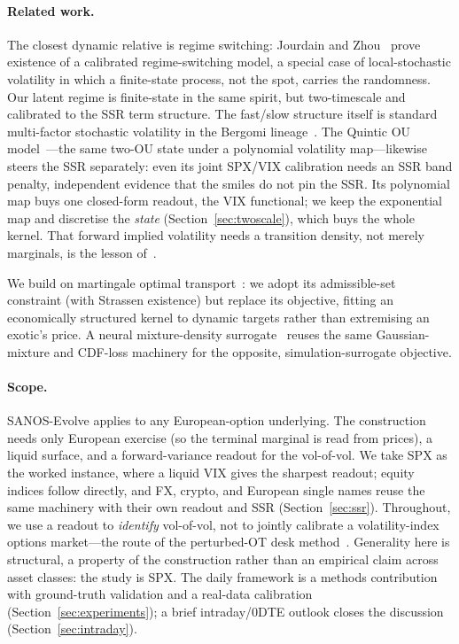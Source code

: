 \documentclass[11pt]{article}
\begin{document}
\paragraph{Related work.}
The closest dynamic relative is regime switching: Jourdain and Zhou~\cite{jourdain2020} prove existence of a calibrated
regime-switching model, a special case of local-stochastic volatility in which a finite-state process,
not the spot, carries the randomness. Our latent regime is finite-state in the same spirit, but
two-timescale and calibrated to the SSR term structure. The fast/slow structure itself is standard
multi-factor stochastic volatility in the Bergomi lineage~\cite{bergomi2009}. The Quintic OU
model~\cite{abijaber2025}---the same two-OU state under a polynomial volatility map---likewise steers
the SSR separately: even its joint SPX/VIX calibration needs an SSR band penalty, independent evidence
that the smiles do not pin the SSR. Its polynomial map buys one closed-form readout, the VIX functional;
we keep the exponential map and discretise the \emph{state} (Section~\ref{sec:twoscale}), which buys the
whole kernel. That forward implied volatility needs a transition density, not merely marginals, is the
lesson of~\cite{glasserman2010forward}.

We build on martingale optimal transport~\cite{strassen1965,beiglbock2013}: we adopt its admissible-set
constraint (with Strassen existence) but replace its objective, fitting an economically structured
kernel to dynamic targets rather than extremising an exotic's price. A neural mixture-density
surrogate~\cite{vandenberg2026} reuses the same Gaussian-mixture and CDF-loss machinery for the
opposite, simulation-surrogate objective.

\paragraph{Scope.}
SANOS-Evolve applies to any European-option underlying. The construction needs only European exercise
(so the terminal marginal is read from prices), a liquid surface, and a forward-variance readout for the
vol-of-vol. We take SPX as the worked instance, where a liquid VIX gives the sharpest readout; equity
indices follow directly, and FX, crypto, and European single names reuse the same machinery with their
own readout and SSR (Section~\ref{sec:ssr}). Throughout, we use a readout to \emph{identify} vol-of-vol,
not to jointly calibrate a volatility-index options market---the route of the perturbed-OT desk
method~\cite{che2026pot}. Generality here is structural, a property of the construction rather than an
empirical claim across asset classes: the study is SPX. The daily framework is a methods contribution
with ground-truth validation and a real-data calibration (Section~\ref{sec:experiments}); a brief
intraday/0DTE outlook closes the discussion (Section~\ref{sec:intraday}).
\end{document}
